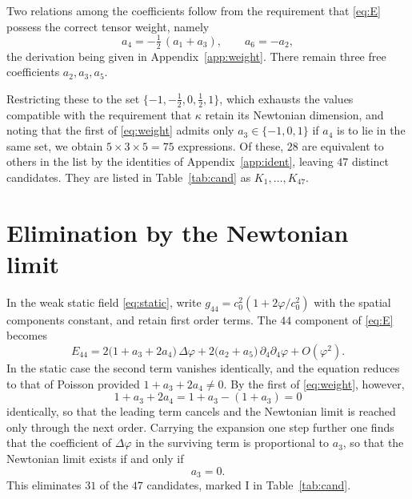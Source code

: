 \documentclass[aps,prd,reprint,amsmath,amssymb,nofootinbib,longbibliography]{revtex4-2}
\begin{document}
Two relations among the coefficients follow from the requirement that \eqref{eq:E} possess the
correct tensor weight, namely
\begin{equation}
a_4 = -\tfrac{1}{2}\,(a_1 + a_3) , \qquad a_6 = - a_2 ,
\label{eq:weight}
\end{equation}
the derivation being given in Appendix~\ref{app:weight}. There remain three free coefficients
$a_2, a_3, a_5$.

Restricting these to the set $\{-1, -\tfrac{1}{2}, 0, \tfrac{1}{2}, 1\}$, which exhausts the values
compatible with the requirement that $\kappa$ retain its Newtonian dimension, and noting that the
first of \eqref{eq:weight} admits only $a_3 \in \{-1, 0, 1\}$ if $a_4$ is to lie in the same set, we
obtain $5 \times 3 \times 5 = 75$ expressions. Of these, $28$ are equivalent to others in the list by
the identities of Appendix~\ref{app:ident}, leaving $47$ distinct candidates. They are listed in
Table~\ref{tab:cand} as $K_1, \dots, K_{47}$.

\section{Elimination by the Newtonian limit}
\label{sec:newt}

In the weak static field \eqref{eq:static}, write $g_{44} = c_0^{2}(1 + 2\varphi/c_0^{2})$ with the
spatial components constant, and retain first order terms. The $44$ component of \eqref{eq:E}
becomes
\begin{equation}
E_{44} = 2\big( 1 + a_3 + 2 a_4 \big)\, \Delta \varphi
       + 2\big( a_2 + a_5 \big)\, \partial_4 \partial_4 \varphi + O(\varphi^{2}) .
\end{equation}
In the static case the second term vanishes identically, and the equation reduces to that of Poisson
provided $1 + a_3 + 2a_4 \neq 0$. By the first of \eqref{eq:weight}, however,
\begin{equation}
1 + a_3 + 2 a_4 = 1 + a_3 - (1 + a_3) = 0
\end{equation}
identically, so that the leading term cancels and the Newtonian limit is reached only through the
next order. Carrying the expansion one step further one finds that the coefficient of
$\Delta\varphi$ in the surviving term is proportional to $a_3$, so that the Newtonian limit exists
if and only if
\begin{equation}
a_3 = 0 .
\label{eq:newt}
\end{equation}
This eliminates $31$ of the $47$ candidates, marked I in Table~\ref{tab:cand}.
\end{document}
